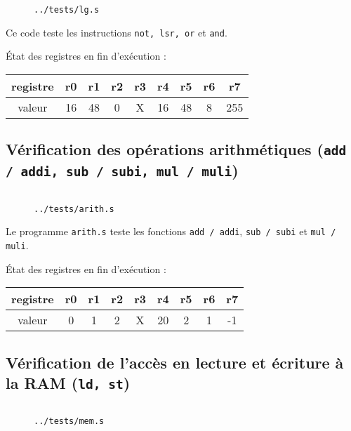 \documentclass[twoside, 12pt, a4paper]{article}
\newcommand{\fm}[2]{
\begin{figure}[!h]
    \centering
    \inputminted[]{asm}{#1}
    \caption{\texttt{#2}}
\end{figure}
}
\begin{document}
\fm{../tests/lg.s}{../tests/lg.s}

Ce code teste les instructions \texttt{not, lsr, or} et \texttt{and}.

État des registres en fin d'exécution :
\begin{center}
    \ttfamily
        \begin{tabular}{|c|c|c|c|c|c|c|c|c|} 
         \hline
         registre & r0 & r1 & r2 & r3 & r4 & r5 & r6 & r7 \\
         \hline
         valeur   & 16 & 48 &  0 &  X & 16 & 48 & 8  & 255\\
         \hline
    \end{tabular}
\end{center}

\subsection{Vérification des opérations arithmétiques (\texttt{add / addi, sub / subi, mul / muli})}

\fm{../tests/arith.s}{../tests/arith.s}

Le programme \texttt{arith.s} teste les fonctions \texttt{add / addi}, \texttt{sub / subi} et \texttt{mul / muli}.

État des registres en fin d'exécution :
\begin{center}
    \ttfamily
        \begin{tabular}{|c|c|c|c|c|c|c|c|c|} 
         \hline
         registre & r0 & r1 & r2 & r3 & r4 & r5 & r6 & r7 \\
         \hline
         valeur   & 0  & 1  & 2  &  X & 20 & 2 &  1  & -1\\
         \hline
    \end{tabular}
\end{center}



\clearpage

\subsection{Vérification de l'accès en lecture et écriture à la RAM (\texttt{ld, st})}

\fm{../tests/mem.s}{../tests/mem.s}
\end{document}
